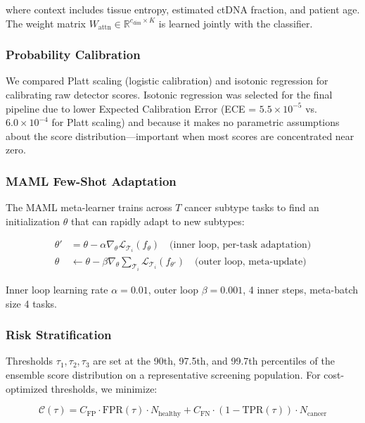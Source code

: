 \documentclass[10pt,a4paper]{article}
\begin{document}
where context includes tissue entropy, estimated ctDNA fraction, and patient age. The weight matrix $W_{\text{attn}} \in \mathbb{R}^{c_{\text{dim}} \times K}$ is learned jointly with the classifier.

\subsubsection{Probability Calibration}

We compared Platt scaling (logistic calibration) and isotonic regression for calibrating raw detector scores. Isotonic regression was selected for the final pipeline due to lower Expected Calibration Error (ECE = $5.5 \times 10^{-5}$ vs. $6.0 \times 10^{-4}$ for Platt scaling) and because it makes no parametric assumptions about the score distribution—important when most scores are concentrated near zero.

\subsubsection{MAML Few-Shot Adaptation}

The MAML meta-learner trains across $T$ cancer subtype tasks to find an initialization $\theta$ that can rapidly adapt to new subtypes:

\begin{align}
\theta' &= \theta - \alpha \nabla_\theta \mathcal{L}_{\mathcal{T}_i}(f_\theta) \quad \text{(inner loop, per-task adaptation)} \\
\theta &\leftarrow \theta - \beta \nabla_\theta \sum_{\mathcal{T}_i} \mathcal{L}_{\mathcal{T}_i}(f_{\theta'}) \quad \text{(outer loop, meta-update)}
\end{align}

Inner loop learning rate $\alpha = 0.01$, outer loop $\beta = 0.001$, 4 inner steps, meta-batch size 4 tasks.

\subsubsection{Risk Stratification}

Thresholds $\tau_1, \tau_2, \tau_3$ are set at the 90th, 97.5th, and 99.7th percentiles of the ensemble score distribution on a representative screening population. For cost-optimized thresholds, we minimize:

\begin{equation}
\mathcal{C}(\tau) = C_{\text{FP}} \cdot \text{FPR}(\tau) \cdot N_{\text{healthy}} + C_{\text{FN}} \cdot (1 - \text{TPR}(\tau)) \cdot N_{\text{cancer}}
\end{equation}
\end{document}
